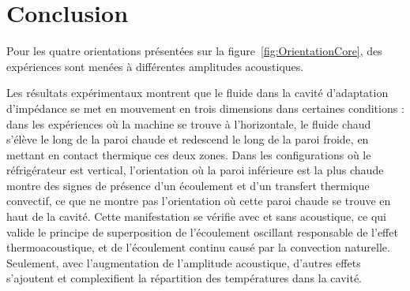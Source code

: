 
\section{Conclusion}
Pour les quatre orientations présentées sur la figure~\ref{fig:OrientationCore}, des expériences sont menées à différentes amplitudes acoustiques.\medskip

Les résultats expérimentaux montrent que le fluide dans la cavité d'adaptation d'impédance se met en mouvement en trois dimensions dans certaines conditions : dans les expériences où la machine se trouve à l'horizontale, le fluide chaud s'élève le long de la paroi chaude et redescend le long de la paroi froide, en mettant en contact thermique ces deux zones. Dans les configurations où le réfrigérateur est vertical, l'orientation où la paroi inférieure est la plus chaude montre des signes de présence d'un écoulement et d'un transfert thermique convectif, ce que ne montre pas l'orientation où cette paroi chaude se trouve en haut de la cavité. Cette manifestation se vérifie avec et sans acoustique, ce qui valide le principe de superposition de l'écoulement oscillant responsable de l'effet thermoacoustique, et de l'écoulement continu causé par la convection naturelle. Seulement, avec l'augmentation de l'amplitude acoustique, d'autres effets s'ajoutent et complexifient la répartition des températures dans la cavité.\medskip

